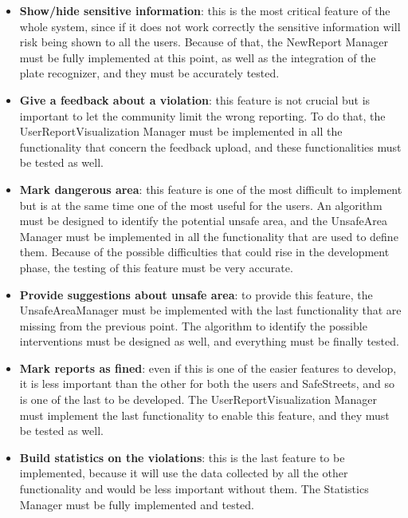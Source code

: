 \documentclass[../RASD.tex]{subfiles}
\begin{document}
\begin{itemize}
        \item \textbf{Show/hide sensitive information}: this is the most critical feature of the whole system, since if it does not work correctly
        the sensitive information will risk being shown to all the users.
        Because of that, the NewReport Manager must be fully implemented at this point, as well as the integration of the plate recognizer,
        and they must be accurately tested.

        \item \textbf{Give a feedback about a violation}: this feature is not crucial but is important to let the community limit the wrong reporting.
        To do that, the UserReportVisualization Manager must be implemented in all the functionality that concern the feedback upload,
        and these functionalities must be tested as well.

        \item \textbf{Mark dangerous area}: this feature is one of the most difficult to implement but is at the same time one of the most useful for the users.
        An algorithm must be designed to identify the potential unsafe area, and the UnsafeArea Manager must be implemented in all the functionality
        that are used to define them.
        Because of the possible difficulties that could rise in the development phase, the testing of this feature must be very accurate.

        \item \textbf{Provide suggestions about unsafe area}: to provide this feature, the UnsafeAreaManager must be implemented with the last functionality
        that are missing from the previous point.
        The algorithm to identify the possible interventions must be designed as well, and everything must be finally tested.

        \item \textbf{Mark reports as fined}: even if this is one of the easier features to develop,
        it is less important than the other for both the users and SafeStreets, and so is one of the last to be developed.
        The UserReportVisualization Manager must implement the last functionality to enable this feature, and they must be tested as well.

        \item \textbf{Build statistics on the violations}: this is the last feature to be implemented, because it will use the data collected
        by all the other functionality and would be less important without them.
        The Statistics Manager must be fully implemented and tested.
    \end{itemize}
\end{document}
